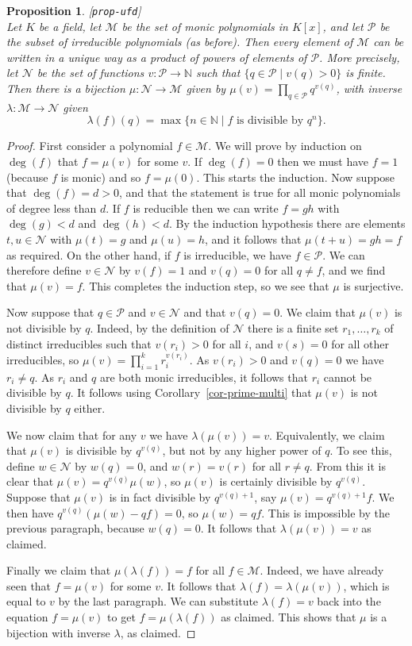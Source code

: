 \documentclass{amsart}
\newcommand{\lbl}[1]{\label{#1}\textup{[\texttt{#1}]}\ \\}
\newcommand{\lbl}{\label}
\newcommand{\N}         {{\mathbb{N}}}
\newcommand{\lm}        {\lambda}
\newcommand{\CM}        {{\mathcal{M}}}
\newcommand{\CN}        {{\mathcal{N}}}
\newcommand{\CP}        {{\mathcal{P}}}
\newcommand{\st}        {\;|\;}
\renewcommand{\:}{\colon}
\newtheorem{proposition}[theorem]{Proposition}
\theoremstyle{definition}
\begin{document}
\begin{proposition}\lbl{prop-ufd}
 Let $K$ be a field, let $\CM$ be the set of monic polynomials in
 $K[x]$, and let $\CP$ be the subset of irreducible polynomials (as
 before).  Then every element of $\CM$ can be written in a unique way
 as a product of powers of elements of $\CP$.  More precisely, let
 $\CN$ be the set of functions $v\:\CP\to\N$ such that
 $\{q\in\CP\st v(q)>0\}$ is finite.  Then there is a bijection
 $\mu\:\CN\to\CM$ given by $\mu(v)=\prod_{q\in\CP}q^{v(q)}$, with
 inverse $\lm\:\CM\to\CN$ given 
 \[ \lm(f)(q) = \max\{n\in\N\st f \text{ is divisible by } q^n\}. \]
\end{proposition}
\begin{proof}
 First consider a polynomial $f\in\CM$.  We will prove by induction on
 $\deg(f)$ that $f=\mu(v)$ for some $v$.  If $\deg(f)=0$ then we must
 have $f=1$ (because $f$ is monic) and so $f=\mu(0)$.  This starts the
 induction.  Now suppose that $\deg(f)=d>0$, and that the statement is
 true for all monic polynomials of degree less than $d$.  If $f$ is
 reducible then we can write $f=gh$ with $\deg(g)<d$ and $\deg(h)<d$.
 By the induction hypothesis there are elements $t,u\in\CN$ with
 $\mu(t)=g$ and $\mu(u)=h$, and it follows that $\mu(t+u)=gh=f$ as
 required.  On the other hand, if $f$ is irreducible, we have
 $f\in\CP$.  We can therefore define $v\in\CN$ by $v(f)=1$ and
 $v(q)=0$ for all $q\neq f$, and we find that $\mu(v)=f$.  This
 completes the induction step, so we see that $\mu$ is surjective.  

 Now suppose that $q\in\CP$ and $v\in\CN$ and that $v(q)=0$.  We claim
 that $\mu(v)$ is not divisible by $q$.  Indeed, by the definition of
 $\CN$ there is a finite set $r_1,\dotsc,r_k$ of distinct irreducibles
 such that $v(r_i)>0$ for all $i$, and $v(s)=0$ for all other
 irreducibles, so $\mu(v)=\prod_{i=1}^kr_i^{v(r_i)}$.  As $v(r_i)>0$
 and $v(q)=0$ we have $r_i\neq q$.  As $r_i$ and $q$ are both monic
 irreducibles, it follows that $r_i$ cannot be divisible by $q$.  It
 follows using Corollary~\ref{cor-prime-multi} that $\mu(v)$ is not
 divisible by $q$ either.

 We now claim that for any $v$ we have $\lm(\mu(v))=v$.  Equivalently,
 we claim that $\mu(v)$ is divisible by $q^{v(q)}$, but not by any
 higher power of $q$.  To see this, define $w\in\CN$ by $w(q)=0$, and
 $w(r)=v(r)$ for all $r\neq q$.  From this it is clear that
 $\mu(v)=q^{v(q)}\mu(w)$, so $\mu(v)$ is certainly divisible by
 $q^{v(q)}$.  Suppose that $\mu(v)$ is in fact divisible by
 $q^{v(q)+1}$, say $\mu(v)=q^{v(q)+1}f$.  We then have
 $q^{v(q)}(\mu(w)-qf)=0$, so $\mu(w)=qf$.  This is impossible by the
 previous paragraph, because $w(q)=0$.  It follows that
 $\lm(\mu(v))=v$ as claimed.

 Finally we claim that $\mu(\lm(f))=f$ for all $f\in\CM$.  Indeed, we
 have already seen that $f=\mu(v)$ for some $v$.  It follows that
 $\lm(f)=\lm(\mu(v))$, which is equal to $v$ by the last paragraph.
 We can substitute $\lm(f)=v$ back into the equation $f=\mu(v)$ to get
 $f=\mu(\lm(f))$ as claimed.  This shows that $\mu$ is a bijection
 with inverse $\lm$, as claimed. 
\end{proof}
\end{document}
